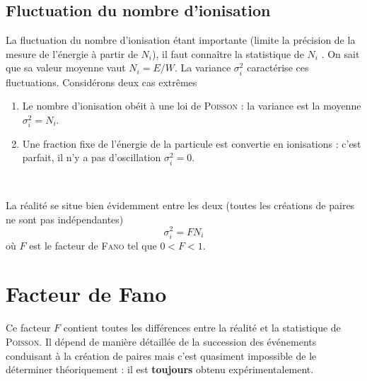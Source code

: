 \subsection{Fluctuation du nombre d'ionisation}
La fluctuation du nombre d'ionisation étant importante (limite la précision de la mesure de 
l'énergie à partir de $N_i$), il faut connaître la statistique de $N_i$ . On sait que sa valeur
moyenne vaut $N_i=E/W$. La variance $\sigma_i^2$ caractérise ces fluctuations. Considérons deux
cas extrêmes
\begin{enumerate}
\item Le nombre d'ionisation obéit à une loi de \textsc{Poisson} : la variance est la moyenne $
\sigma_i^2=N_i$.
\item Une fraction fixe de l'énergie de la particule est convertie en ionisations : c'est parfait, 
il n'y a pas d'oscillation $\sigma_i^2=0$.
\end{enumerate}\ 

La réalité se situe bien évidemment entre les deux (toutes les créations de paires ne sont pas
indépendantes)
\begin{equation}
\sigma_i^2 = FN_i
\end{equation}
où $F$ est le facteur de \textsc{Fano} tel que $0<F<1$.

\section{Facteur de Fano}
Ce facteur $F$ contient toutes les différences entre la réalité et la statistique de 
\textsc{Poisson}. Il dépend de manière détaillée de la succession des événements conduisant à la
création de paires mais c'est quasiment impossible de le déterminer théoriquement : il est
\textbf{toujours} obtenu expérimentalement.